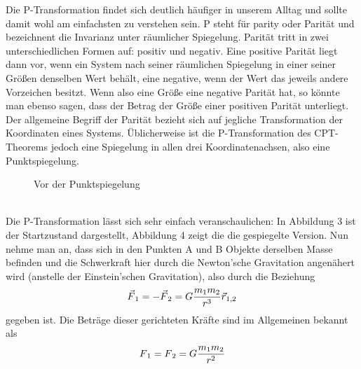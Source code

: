 \documentclass[12pt,a4paper]{scrartcl}
\numberwithin{equation}{section}
\begin{document}
Die P-Transformation findet sich deutlich häufiger in unserem Alltag und sollte damit wohl am einfachsten zu verstehen sein. P steht für parity oder Parität und bezeichnent die Invarianz unter räumlicher Spiegelung. Parität tritt in zwei unterschiedlichen Formen auf: positiv und negativ. Eine positive Parität liegt dann vor, wenn ein System nach seiner räumlichen Spiegelung in einer seiner Größen denselben Wert behält, eine negative, wenn der Wert das jeweils andere Vorzeichen besitzt. Wenn also eine Größe eine negative Parität hat, so könnte man ebenso sagen, dass der Betrag der Größe einer positiven Parität unterliegt. Der allgemeine Begriff der Parität bezieht sich auf jegliche Transformation der Koordinaten eines Systems. Üblicherweise ist die P-Transformation des CPT-Theorems jedoch eine Spiegelung in allen drei Koordinatenachsen, also eine Punktspiegelung.
\begin{figure} [!ht]
\centering
{}
\caption{Vor der Punktspiegelung}
\end{figure}
\\
Die P-Transformation lässt sich sehr einfach veranschaulichen: In Abbildung 3 ist der Startzustand dargestellt, Abbildung 4 zeigt die die gespiegelte Version. Nun nehme man an, dass sich in den Punkten A und B Objekte derselben Masse befinden und die Schwerkraft hier durch die Newton'sche Gravitation angenähert wird (anstelle der Einstein'schen Gravitation), also durch die Beziehung
\begin{align}
  \vec{F}\textsubscript{1} = -\vec{F}\textsubscript{2} = G\frac{m\textsubscript{1}m\textsubscript{2}}{r^3}\vec{r}\textsubscript{1,2}
\end{align}
gegeben ist. Die Beträge dieser gerichteten Kräfte sind im Allgemeinen bekannt als
\begin{align}
  {F}\textsubscript{1} = {F}\textsubscript{2} = G\frac{m\textsubscript{1}m\textsubscript{2}}{r^2}
\end{align}
\end{document}
